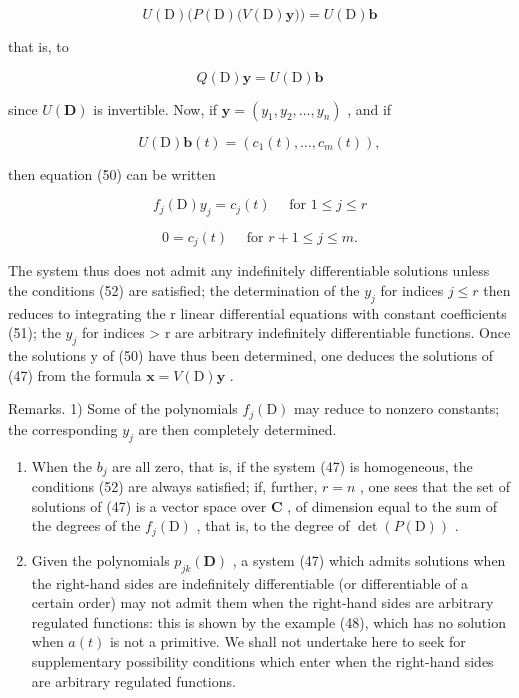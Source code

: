 \[
U (\mathrm{D}) \big (P (\mathrm{D}) \big (V (\mathrm{D}) \mathbf {y} \big) \big) = U (\mathrm{D}) \mathbf {b}
\]

that is, to

\[
Q (\mathrm{D}) \mathbf {y} = U (\mathrm{D}) \mathbf {b}\tag{50}
\]

since \(U(\mathbf{D})\) is invertible. Now, if \(\mathbf{y} = (y_1, y_2, \ldots, y_n)\) , and if

\[
U (\mathrm{D}) \mathbf {b} (t) = \left(c _ {1} (t), \dots , c _ {m} (t)\right),
\]

then equation (50) can be written

\[
f _ {j} (\mathrm{D}) y _ {j} = c _ {j} (t) \quad \text {   for   } 1 \leqslant j \leqslant r\tag{51}
\]

\[
0 = c _ {j} (t) \quad \text {   for   } r + 1 \leqslant j \leqslant m.\tag{52}
\]

The system thus does not admit any indefinitely differentiable solutions unless the conditions (52) are satisfied; the determination of the \(y_{j}\) for indices \(j \leqslant r\) then reduces to integrating the r linear differential equations with constant coefficients (51); the \(y_{j}\) for indices \textgreater{} r are arbitrary indefinitely differentiable functions. Once the solutions y of (50) have thus been determined, one deduces the solutions of (47) from the formula \(\mathbf{x} = V(\mathrm{D})\mathbf{y}\) .

Remarks. 1) Some of the polynomials \(f_{j}(\mathrm{D})\) may reduce to nonzero constants; the corresponding \(y_{j}\) are then completely determined.

\begin{enumerate}
\def\labelenumi{\arabic{enumi})}
\setcounter{enumi}{1}
\item
  When the \(b_{j}\) are all zero, that is, if the system (47) is homogeneous, the conditions (52) are always satisfied; if, further, \(r = n\) , one sees that the set of solutions of (47) is a vector space over \(\mathbf{C}\) , of dimension equal to the sum of the degrees of the \(f_{j}(\mathrm{D})\) , that is, to the degree of \(\det(P(\mathrm{D}))\) .
\item
  Given the polynomials \(p_{jk}(\mathbf{D})\) , a system (47) which admits solutions when the right-hand sides are indefinitely differentiable (or differentiable of a certain order) may not admit them when the right-hand sides are arbitrary regulated functions: this is shown by the example (48), which has no solution when \(a(t)\) is not a primitive. We shall not undertake here to seek for supplementary possibility conditions which enter when the right-hand sides are arbitrary regulated functions.
\end{enumerate}

\setcounter{exercisegroup}{0}
